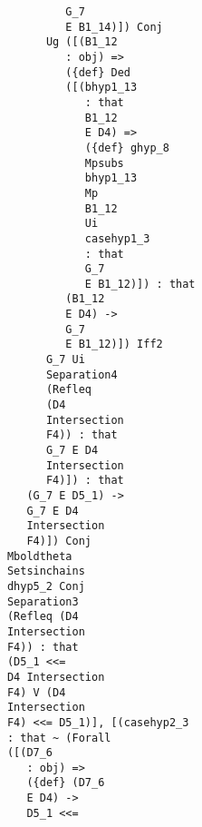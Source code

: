 \documentclass[12pt]{article}
\begin{document}
\begin{verbatim}
                                        G_7 
                                        E B1_14)]) Conj 
                                     Ug ([(B1_12 
                                        : obj) => 
                                        ({def} Ded 
                                        ([(bhyp1_13 
                                           : that 
                                           B1_12 
                                           E D4) => 
                                           ({def} ghyp_8 
                                           Mpsubs 
                                           bhyp1_13 
                                           Mp 
                                           B1_12 
                                           Ui 
                                           casehyp1_3 
                                           : that 
                                           G_7 
                                           E B1_12)]) : that 
                                        (B1_12 
                                        E D4) -> 
                                        G_7 
                                        E B1_12)]) Iff2 
                                     G_7 Ui 
                                     Separation4 
                                     (Refleq 
                                     (D4 
                                     Intersection 
                                     F4)) : that 
                                     G_7 E D4 
                                     Intersection 
                                     F4)]) : that 
                                  (G_7 E D5_1) -> 
                                  G_7 E D4 
                                  Intersection 
                                  F4)]) Conj 
                               Mboldtheta 
                               Setsinchains 
                               dhyp5_2 Conj 
                               Separation3 
                               (Refleq (D4 
                               Intersection 
                               F4)) : that 
                               (D5_1 <<= 
                               D4 Intersection 
                               F4) V (D4 
                               Intersection 
                               F4) <<= D5_1)], [(casehyp2_3 
                               : that ~ (Forall 
                               ([(D7_6 
                                  : obj) => 
                                  ({def} (D7_6 
                                  E D4) -> 
                                  D5_1 <<= 

\end{verbatim}
\end{document}
